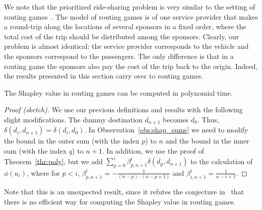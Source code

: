 \documentclass[sigconf]{aamas}
\begin{document}
We note that the prioritized ride-sharing problem is very similar to the setting of routing games~\cite{potters1992traveling}. The model of routing games is of one service provider that makes a round-trip along the locations of several sponsors in a fixed order, where the total cost of the trip should be distributed among the sponsors. Clearly, our problem is almost identical: the service provider corresponds to the vehicle and the sponsors correspond to the passengers. The only difference is that in a routing game the sponsors also pay the cost of the trip back to the origin. Indeed, the results presented in this section carry over to routing games.
\begin{theorem}
The Shapley value in routing games can be computed in polynomial time.
\end{theorem}
\begin{proof}[Proof (sketch)]
We use our previous definitions and results with the following slight modifications. The dummy destination $d_{n+1}$ becomes $d_0$. Thus, $\delta(d_i,d_{n+1})=\delta(d_i,d_0)$. In Observation~\ref{obs:shap_sums} we need to modify the bound in the outer sum (with the index $p$) to $n$ and the bound in the inner sum (with the index $q$) to $n+1$. In addition, we use the proof of  Theorem~\ref{thr:poly}, but we add $\sum\limits_{p=0}^{i} \beta_{p,n+1}^i\delta(d_p,d_{n+1})$ to the calculation of $\phi(u_i)$, where for $p<i$, $\beta_{p,n+1}^i = -\frac{1}{(n-p)\cdot (n-p+1)}$ and $\beta_{i,n+1}^i = \frac{1}{n-i+1}$.
\end{proof}
Note that this is an unexpected result, since it refutes the conjecture in~\cite{yengin2012characterizing} that there is no efficient way for computing the Shapley value in routing games.
\end{document}
